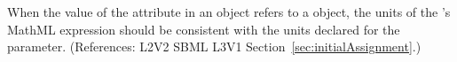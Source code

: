 When the value of the attribute  in an \InitialAssignment
object refers to a \Parameter object, the units of the \InitialAssignment's
MathML  expression should be consistent with the units declared for
the parameter.  (References: L2V2 SBML L3V1
Section~\ref{sec:initialAssignment}.)
